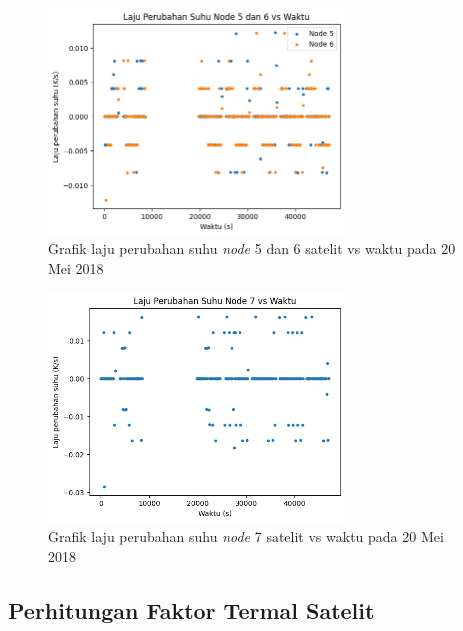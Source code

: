 \begin{figure}[H]
\setlength{}
\begin{center}
\includegraphics[width=0.7\textwidth]{fig/base_node56_tempchange_2018-05-20.png}
	\caption{Grafik laju perubahan suhu \textit{node} 5 dan 6 satelit vs waktu pada 20 Mei 2018}
\label{fig:basetempchange5620}
\end{center}
\end{figure}

\begin{figure}[H]
\setlength{}
\begin{center}
\includegraphics[width=0.7\textwidth]{fig/base_node7_tempchange_2018-05-20.png}
	\caption{Grafik laju perubahan suhu \textit{node} 7 satelit vs waktu pada 20 Mei 2018}
\label{fig:basetempchange720}
\end{center}
\end{figure}

\subsection{Perhitungan Faktor Termal Satelit}

